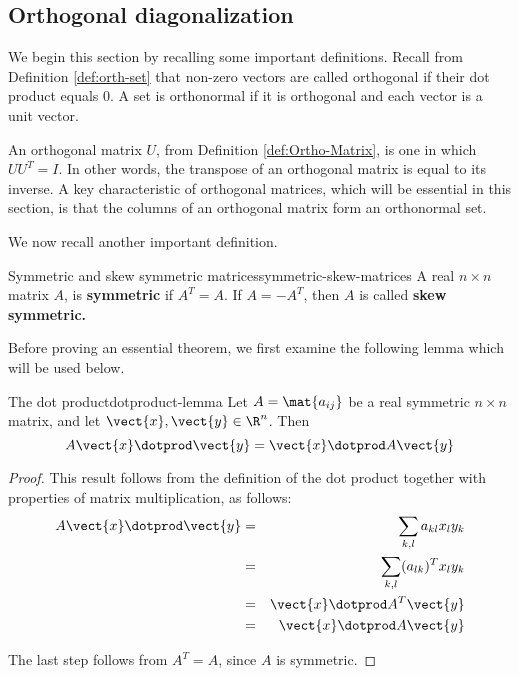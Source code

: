 \subsection{Orthogonal diagonalization}

We begin this section by recalling some important definitions. Recall from Definition \ref{def:orth-set} that non-zero vectors are called orthogonal if their dot product equals $0$.  A set is orthonormal if it is orthogonal and each vector is a unit vector. 

An orthogonal matrix $U$, from Definition \ref{def:Ortho-Matrix}, is one in which $UU^{T} = I$. In other words, the transpose of an orthogonal matrix is equal to its inverse. A key characteristic of orthogonal matrices, which will be essential in this section, is that the columns of an orthogonal matrix form an orthonormal set. 

We now recall another important definition. 

\begin{definition}{Symmetric and skew symmetric matrices}{symmetric-skew-matrices}
A real $n\times n$ matrix $A$, is \textbf{symmetric }if $A^{T}=A$. If $%
A=-A^{T}$, then $A$ is called \textbf{skew symmetric. }
\end{definition}

Before proving an essential theorem, we first examine the following lemma which will be used below.

\begin{lemma}{The dot product}{dotproduct-lemma}
Let $A=\mat{a_{ij} }$ be a real symmetric $n \times n$ matrix, and let $\vect{x}, \vect{y} \in \R^n$. Then
\[
A\vect{x} \dotprod \vect{y} = \vect{x} \dotprod A \vect{y}
\]
\end{lemma}

\begin{proof}
This result follows from the definition of the dot product together with properties of matrix multiplication, as follows:
\begin{eqnarray*}
A\vect{x} \dotprod \vect{y} &=& \sum_{k,l}a_{kl}x_{l}y_{k} \\
&=&\sum_{k,l} (a_{lk})^Tx_{l}y_{k} \\
&=& \vect{x}\dotprod A^{T}\vect{y} \\
&=& \vect{x}\dotprod A \vect{y}
\end{eqnarray*}

The last step follows from $A^T = A$, since $A$ is symmetric. 
\end{proof}

